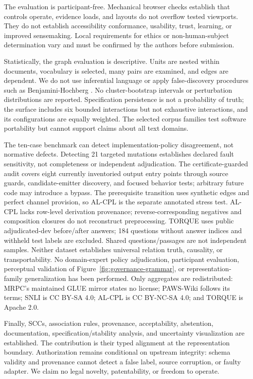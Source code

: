 \documentclass[manuscript,screen,review]{acmart}
\begin{document}
The evaluation is participant-free. Mechanical browser checks establish that controls operate, evidence loads, and layouts do not overflow tested viewports. They do not establish accessibility conformance, usability, trust, learning, or improved sensemaking. Local requirements for ethics or non-human-subject determination vary and must be confirmed by the authors before submission.

Statistically, the graph evaluation is descriptive. Units are nested within documents, vocabulary is selected, many pairs are examined, and edges are dependent. We do not use inferential language or apply false-discovery procedures such as Benjamini-Hochberg \cite{benjamini1995}. No cluster-bootstrap intervals or perturbation distributions are reported. Specification persistence is not a probability of truth; the surface includes six bounded interactions but not exhaustive interactions, and its configurations are equally weighted. The selected corpus families test software portability but cannot support claims about all text domains.

The ten-case benchmark can detect implementation-policy disagreement, not normative defects. Detecting 21 targeted mutations establishes declared fault sensitivity, not completeness or independent adjudication. The certificate-guarded audit covers eight currently inventoried output entry points through source guards, candidate-emitter discovery, and focused behavior tests; arbitrary future code may introduce a bypass. The prerequisite transition uses synthetic edges and perfect channel provision, so AL-CPL is the separate annotated stress test. AL-CPL lacks row-level derivation provenance; reverse-corresponding negatives and composition closures do not reconstruct preprocessing. TORQUE uses public adjudicated-dev before/after answers; 184 questions without answer indices and withheld test labels are excluded. Shared questions/passages are not independent samples. Neither dataset establishes universal relation truth, causality, or transportability. No domain-expert policy adjudication, participant evaluation, perceptual validation of Figure~\ref{fig:governance-grammar}, or representation-family generalization has been performed. Only aggregates are redistributed: MRPC's maintained GLUE mirror states no license; PAWS-Wiki follows its terms; SNLI is CC BY-SA 4.0; AL-CPL is CC BY-NC-SA 4.0; and TORQUE is Apache 2.0.

Finally, SCCs, association rules, provenance, acceptability, abstention, documentation, specification/stability analysis, and uncertainty visualization are established. The contribution is their typed alignment at the representation boundary. Authorization remains conditional on upstream integrity: schema validity and provenance cannot detect a false label, source corruption, or faulty adapter. We claim no legal novelty, patentability, or freedom to operate.
\end{document}
